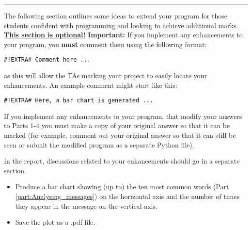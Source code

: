 \documentclass[11pt]{report}
\begin{document}

\vspace{1em}
\hrule
\vspace{1em}


\begin{Exercise}[title=(* Optional) Enhancements]
[Up to 15 marks]
\newline
The following section outlines some ideas to extend your program for those students confident with programming and looking to achieve additional marks. \textbf{\underline{This section is optional!}} \newline
\textbf{Important:} 
\newline If you implement any enhancements to your program, you \textbf{must} comment them using the following format:

\vspace{0.5em}
{\tt \#!EXTRA\# Comment here ...}
\vspace{0.5em}

as this will allow the TAs marking your project to easily locate your enhancements. An example comment might start like this:

\vspace{0.5em}
{\tt \#!EXTRA\# Here, a bar chart is generated ...}
\vspace{0.5em}

\newline
If you implement any enhancements to your program, that modify your answers to Parts 1-4 you must make a copy of your original answer so that it can be marked (for example, comment out your original answer so that it can still be seen or submit the modified program as a separate Python file).  

In the report, discussions related to your enhancements should go in a separate section.\\
\begin{itemize}
    \item Produce a bar chart showing (up to)  the  ten  most  common  words (Part \ref{part:Analysing_messages}) on the horizontal axis and the  number  of times they appear in the message on the vertical axis. 
    \item Save the plot as a .pdf file.
    

\end{itemize}
\end{Exercise}
\end{document}
